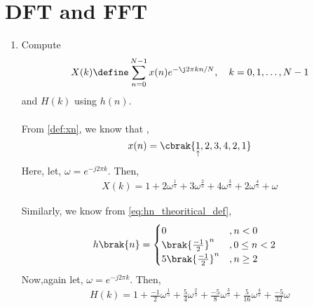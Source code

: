 \documentclass[journal,12pt,twocolumn]{IEEEtran}
\renewcommand\thesection{\arabic{section}}
\begin{document}
\section{DFT and FFT}
\begin{enumerate}[label=\thesection.\arabic*]
\item
Compute
\begin{equation}
X(k) \define \sum _{n=0}^{N-1}x(n) e^{-\j2\pi kn/N}, \quad k = 0,1,\dots, N-1
\end{equation}
and $H(k)$ using $h(n)$.
\\\solution\\
From \ref{def:xn}, we know that ,
\begin{equation}
	x(n) = \cbrak{\underset{\uparrow}{1},2,3,4,2,1}
\end{equation}
Here, let, $\omega=e^{-j2\pi k}$. Then,
\begin{align}
	X(k)=1+2\omega^{\frac{1}{5}}+3\omega^{\frac{2}{5}}+4\omega^{\frac{3}{5}}+2\omega^{\frac{4}{5}}+\omega
	\label{eq:Xkdef}
\end{align}

Similarly, we know from \eqref{eq:hn_theoritical_def},
\begin{align}
	h\brak{n} &= \begin{cases}
					 0 &, n < 0\\
					 \brak{\frac{-1}{2}}^n &, 0\leq n<2\\
					 5\brak{\frac{-1}{2}}^n &, n \geq 2
				  \end{cases}
\end{align}
Now,again let, $\omega=e^{-j2\pi k}$. Then,
\begin{align}
	H(k)=1+\frac{-1}{2}\omega^{\frac{1}{5}}+\frac{5}{4}\omega^{\frac{2}{5}}+\frac{-5}{8}\omega^{\frac{3}{5}}+\frac{5}{16}\omega^{\frac{4}{5}}+\frac{-5}{32}\omega
	\label{eq:Hkdef}
\end{align}


\end{enumerate}
\end{document}
